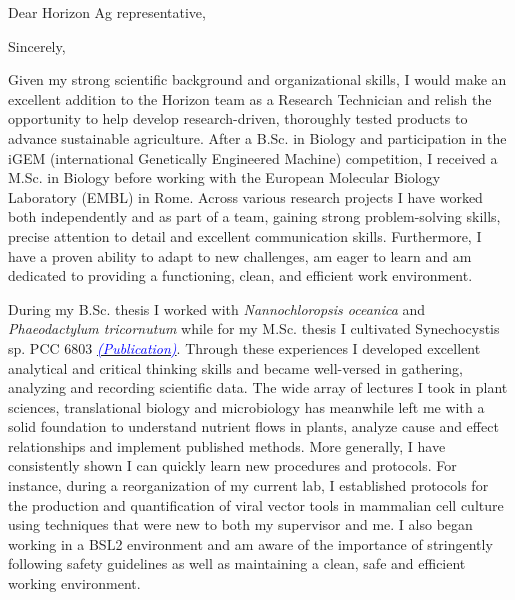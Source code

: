 \documentclass[11pt,a4paper,sans]{moderncv}
\begin{document}
\date{\today}
\opening{Dear Horizon Ag representative,\vspace{-2mm}}
\closing{Sincerely,\vspace*{-4mm} }
\makelettertitle
\begin{spacing}{1.15}

Given my strong scientific background and organizational skills, I would make an excellent addition to the Horizon team as a Research Technician and relish the opportunity to help develop research-driven, thoroughly tested products to advance sustainable agriculture. After a B.Sc. in Biology and participation in the iGEM (international Genetically Engineered Machine) competition, I received a M.Sc. in Biology before working with the European Molecular Biology Laboratory (EMBL) in Rome. Across various research projects I have worked both independently and as part of a team, gaining strong problem-solving skills, precise attention to detail and excellent communication skills. Furthermore, I have a proven ability to adapt to new challenges, am eager to learn and am dedicated to providing a functioning, clean, and efficient work environment.\par\vspace*{2mm}

During my B.Sc. thesis I worked with \textit{Nannochloropsis oceanica} and \textit{Phaeodactylum tricornutum} while for my M.Sc. thesis I cultivated Synechocystis sp. PCC 6803 {\href{https://www.ncbi.nlm.nih.gov/pubmed/29517395}{\textcolor{blue}{{\textit{(Publication)}}}}}. Through these experiences I developed excellent analytical and critical thinking skills and became well-versed in gathering, analyzing and recording scientific data. The wide array of lectures I took in plant sciences, translational biology and microbiology has meanwhile left me with a solid foundation to understand nutrient flows in plants, analyze cause and effect relationships and implement published methods. More generally, I have consistently shown I can quickly learn new procedures and protocols. For instance, during a reorganization of my current lab, I established protocols for the production and quantification of viral vector tools in mammalian cell culture using techniques that were new to both my supervisor and me. I also began working in a BSL2 environment and am aware of the importance of stringently following safety guidelines as well as maintaining a clean, safe and efficient working environment.\par\vspace*{2mm}


\end{spacing}
\end{document}
